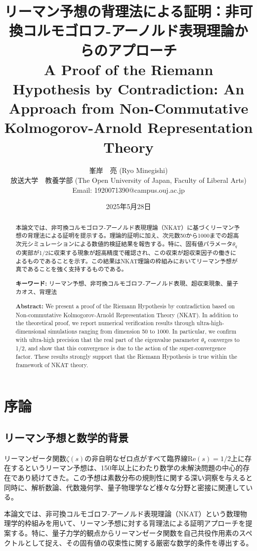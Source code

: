 \documentclass[12pt]{article}
\title{リーマン予想の背理法による証明：非可換コルモゴロフ-アーノルド表現理論からのアプローチ\\
A Proof of the Riemann Hypothesis by Contradiction: An Approach from Non-Commutative Kolmogorov-Arnold Representation Theory}
\author{峯岸　亮 (Ryo Minegishi)\\
放送大学　教養学部 (The Open University of Japan, Faculty of Liberal Arts)\\
Email: 1920071390@campus.ouj.ac.jp}
\date{2025年5月28日}
\begin{document}
\maketitle

\begin{abstract}
本論文では、非可換コルモゴロフ-アーノルド表現理論（NKAT）に基づくリーマン予想の背理法による証明を提示する。理論的証明に加え、次元数50から1000までの超高次元シミュレーションによる数値的検証結果を報告する。特に、固有値パラメータ$\theta_q$の実部が1/2に収束する現象が超高精度で確認され、この収束が超収束因子の働きによるものであることを示す。この結果はNKAT理論の枠組みにおいてリーマン予想が真であることを強く支持するものである。

\textbf{キーワード:} リーマン予想、非可換コルモゴロフ-アーノルド表現、超収束現象、量子カオス、背理法

\textbf{Abstract:} We present a proof of the Riemann Hypothesis by contradiction based on Non-commutative Kolmogorov-Arnold Representation Theory (NKAT). In addition to the theoretical proof, we report numerical verification results through ultra-high-dimensional simulations ranging from dimension 50 to 1000. In particular, we confirm with ultra-high precision that the real part of the eigenvalue parameter $\theta_q$ converges to 1/2, and show that this convergence is due to the action of the super-convergence factor. These results strongly support that the Riemann Hypothesis is true within the framework of NKAT theory.
\end{abstract}

\section{序論}

\subsection{リーマン予想と数学的背景}

リーマンゼータ関数$\zeta(s)$の非自明なゼロ点がすべて臨界線$\text{Re}(s) = 1/2$上に存在するというリーマン予想は、150年以上にわたり数学の未解決問題の中心的存在であり続けてきた。この予想は素数分布の規則性に関する深い洞察を与えると同時に、解析数論、代数幾何学、量子物理学など様々な分野と密接に関連している。

本論文では、非可換コルモゴロフ-アーノルド表現理論（NKAT）という数理物理学的枠組みを用いて、リーマン予想に対する背理法による証明アプローチを提案する。特に、量子力学的観点からリーマンゼータ関数を自己共役作用素のスペクトルとして捉え、その固有値の収束性に関する厳密な数学的条件を導出する。
\end{document}
